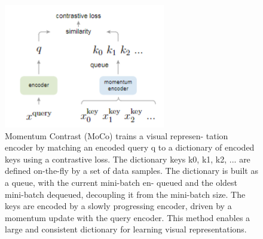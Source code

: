 \documentclass[10pt,twocolumn]{article}  %
\begin{document}
\begin{figure}[htbp]
    \centering
    \includegraphics[width=0.8\linewidth]{Pic/figure1.png} %
    \caption{Momentum Contrast (MoCo) trains a visual represen-
    tation encoder by matching an encoded query q to a dictionary
    of encoded keys using a contrastive loss. The dictionary keys
    {k0, k1, k2, ...} are defined on-the-fly by a set of data samples.
    The dictionary is built as a queue, with the current mini-batch en-
    queued and the oldest mini-batch dequeued, decoupling it from
    the mini-batch size. The keys are encoded by a slowly progressing
    encoder, driven by a momentum update with the query encoder.
    This method enables a large and consistent dictionary for learning
    visual representations.} %
    \label{fig:Figure 1} %
\end{figure}
\end{document}
